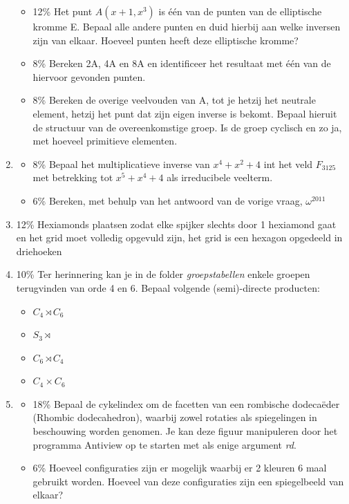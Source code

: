 \documentclass{article}
\def\warning#1{\color{red} #1 \color{black}}
\def\note#1{\color{cyan} #1 \color{black}}
\begin{document}
\begin{enumerate}
{{\begin{itemize}[label={}]
    \item \note{12\%} Het punt $A(x + 1, x^3)$ is één van de punten van de elliptische kromme E. Bepaal alle andere punten en duid hierbij aan welke inversen zijn van elkaar. Hoeveel punten heeft deze elliptische kromme?

    \item \note{8\%} Bereken 2A, 4A en 8A en identificeer het resultaat met één van de hiervoor gevonden punten.
    
    
    \item \note{8\%} Bereken de overige veelvouden van A, tot je hetzij het neutrale element, hetzij het punt dat zijn eigen inverse is bekomt. Bepaal hieruit de structuur van de overeenkomstige groep. Is de groep cyclisch en zo ja, met hoeveel primitieve elementen. 


      \end{itemize}}
}
  \item {
    \begin{itemize}[label={}]
        \item \note{8\%} Bepaal het multiplicatieve inverse van $x^4 + x^2 + 4$ int het veld $F_{3125}$ met betrekking tot $x^5 + x^4 + 4$ als irreducibele veelterm.
        \item \note{6\%} Bereken, met behulp van het antwoord van de vorige vraag, $\omega^{2011}$
    \end{itemize}
  
  }
  \item {\note{12\%} \warning{Hexiamonds plaatsen zodat elke spijker slechts door 1 hexiamond gaat en het grid moet volledig opgevuld zijn, het grid is een hexagon opgedeeld in driehoeken}}    
  
  \item {\note{10\%}}Ter herinnering kan je in de folder \textit{groepstabellen} enkele groepen terugvinden van orde 4 en 6. Bepaal volgende (semi)-directe producten:
        \begin{itemize}
         \item $C_4 \rtimes C_6$
         \item $S_3 \rtimes $
         \item $C_6 \rtimes C_4$
         \item $C_4 \times C_6$
        \end{itemize}


                    
                    

  \item {\begin{itemize}
      \item {\note{18\%} Bepaal de cykelindex om de facetten van een rombische dodecaëder (Rhombic dodecahedron), waarbij zowel rotaties als spiegelingen in beschouwing worden genomen. Je kan deze figuur manipuleren door het programma Antiview op te starten met als enige argument \textit{rd}.
        }
      \item {\note{6\%} Hoeveel configuraties zijn er mogelijk waarbij er 2 kleuren 6 maal gebruikt worden. Hoeveel van deze configuraties zijn een spiegelbeeld van elkaar?

}
\end{itemize}}
\end{enumerate}
\end{document}
